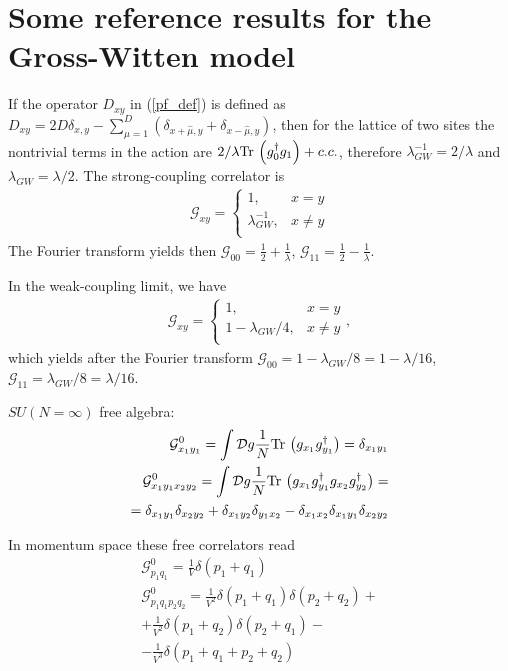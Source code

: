 \documentclass[twocolumn,showpacs,preprintnumbers,superscriptaddress,amsmath,floatfix,amssymb,secnumarabic]{revtex4}
\newcommand{\lr}[1]{ \left( #1 \right) }
\newcommand{\tr}{ {\rm Tr} \, }
\begin{document}
\section{Some reference results for the Gross-Witten model}

 If the operator $D_{x y}$ in (\ref{pf_def}) is defined as $D_{x y} = 2 D \delta_{x,y} - \sum\limits_{\mu=1}^{D} \lr{\delta_{x+\hat{\mu},y} + \delta_{x-\hat{\mu},y}}$, then for the lattice of two sites the nontrivial terms in the action are $2/\lambda \tr\lr{g^{\dag}_0 g_1} + c.c.$, therefore $\lambda_{GW}^{-1} = 2/\lambda$ and $\lambda_{GW} = \lambda/2$. The strong-coupling correlator is
\begin{eqnarray}
\label{gw_sc_correlator}
 \mathcal{G}_{xy} =
 \begin{cases}
                  1, & x = y \\
  \lambda_{GW}^{-1}, & x \neq y \\
 \end{cases}
\end{eqnarray}
The Fourier transform yields then $\mathcal{G}_{00} = \frac{1}{2} + \frac{1}{\lambda}$, $\mathcal{G}_{11} = \frac{1}{2} - \frac{1}{\lambda}$.

In the weak-coupling limit, we have
\begin{eqnarray}
\label{gw_sc_correlator}
 \mathcal{G}_{xy} =
 \begin{cases}
                   1, & x = y \\
  1 - \lambda_{GW}/4, & x \neq y \\
 \end{cases} ,
\end{eqnarray}
which yields after the Fourier transform $\mathcal{G}_{00} = 1 - \lambda_{GW}/8 = 1 - \lambda/16$, $\mathcal{G}_{11} = \lambda_{GW}/8 = \lambda/16$.

$SU\lr{N=\infty}$ free algebra:
\begin{eqnarray}
\label{sun_free_algebra}
 \mathcal{G}^{0}_{x_1 y_1} = \int\mathcal{D}g \frac{1}{N} \tr\lr{g_{x_1} g^{\dag}_{y_1}}
 = \delta_{x_1 y_1}
\nonumber \\
 \mathcal{G}^{0}_{x_1 y_1 x_2 y_2} = \int\mathcal{D}g \frac{1}{N} \tr\lr{g_{x_1} g^{\dag}_{y_1} g_{x_2} g^{\dag}_{y_2}}
 = \nonumber \\ =
 \delta_{x_1 y_1} \delta_{x_2 y_2} + \delta_{x_1 y_2} \delta_{y_1 x_2} - \delta_{x_1 x_2} \delta_{x_1 y_1} \delta_{x_2 y_2}
\end{eqnarray}

In momentum space these free correlators read
\begin{eqnarray}
\label{sun_free_algebra_mspace}
 \mathcal{G}^{0}_{p_1 q_1} = \frac{1}{V} \delta\lr{p_1 + q_1}
\nonumber \\
 \mathcal{G}^{0}_{p_1 q_1 p_2 q_2} =
 \frac{1}{V^2} \delta\lr{p_1 + q_1} \delta\lr{p_2 + q_2}
 + \nonumber \\ +
 \frac{1}{V^2} \delta\lr{p_1 + q_2} \delta\lr{p_2 + q_1}
 - \nonumber \\ -
 \frac{1}{V^3} \delta\lr{p_1 + q_1 + p_2 + q_2}
\end{eqnarray}
\end{document}
